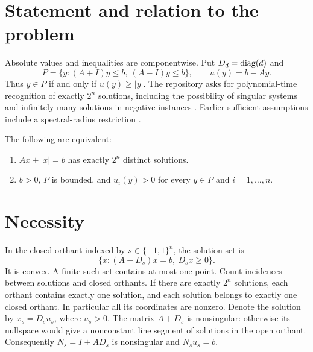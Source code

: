 

\begin{abstract}
For rational $A\in\R^{n\times n}$ and $b\in\R^n$, we give a polynomial-time test for whether $Ax+|x|=b$ has exactly $2^n$ distinct solutions. The test uses $n+1$ rational linear-programming feasibility problems. No nonsingularity or spectral-radius promise is required; infinite solution sets are rejected. The proof characterizes the maximum finite solution count by the geometry of a polytope with paired inequalities.
\end{abstract}
\section{Statement and relation to the problem}
Absolute values and inequalities are componentwise. Put $D_d=\operatorname{diag}(d)$ and
\[
 P=\{y:(A+I)y\le b,\ (A-I)y\le b\},\qquad u(y)=b-Ay.
\]
Thus $y\in P$ if and only if $u(y)\ge |y|$. The repository asks for polynomial-time recognition of exactly $2^n$ solutions, including the possibility of singular systems and infinitely many solutions in negative instances \cite{repo}. Earlier sufficient assumptions include a spectral-radius restriction \cite{hladik}.
\begin{theorem}\label{thm:main}
The following are equivalent:
\begin{enumerate}
\item $Ax+|x|=b$ has exactly $2^n$ distinct solutions.
\item $b>0$, $P$ is bounded, and $u_i(y)>0$ for every $y\in P$ and $i=1,\ldots,n$.
\end{enumerate}
\end{theorem}
\section{Necessity}
In the closed orthant indexed by $s\in\{-1,1\}^n$, the solution set is
\[
 \{x:(A+D_s)x=b,\ D_sx\ge0\}.
\]
It is convex. A finite such set contains at most one point. Count incidences between solutions and closed orthants. If there are exactly $2^n$ solutions, each orthant contains exactly one solution, and each solution belongs to exactly one closed orthant. In particular all its coordinates are nonzero. Denote the solution by $x_s=D_su_s$, where $u_s>0$. The matrix $A+D_s$ is nonsingular: otherwise its nullspace would give a nonconstant line segment of solutions in the open orthant. Consequently $N_s=I+AD_s$ is nonsingular and $N_su_s=b$.

